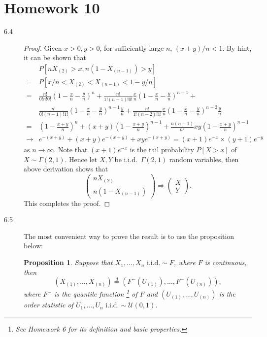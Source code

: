 \documentclass{article}
\theoremstyle{definition}
\theoremstyle{plain}
\newtheorem*{prop}{Proposition}
\theoremstyle{remark}
\begin{document}
\newpage

\section*{Homework 10}
\begin{description}
\item[6.4]
\begin{proof}
Given $x > 0, y > 0$, for sufficiently large $n$, $(x + y)/n < 1$. By hint, it can be shown that
\begin{align*}
& P[nX_{(2)} > x, n(1 - X_{(n - 1)}) > y] \\
= & P[x/n < X_{(2)} < X_{(n - 1)} < 1 - y/n] \\
= & \frac{n!}{0!n!0!}\left(1 - \frac{x}{n} - \frac{y}{n}\right)^{n} + \frac{n!}{1!(n - 1)!0!}\frac{x}{n}\left(1 - \frac{x}{n} - \frac{y}{n}\right)^{n - 1} + \\
& \frac{n!}{0!(n - 1)!1!}\left(1 - \frac{x}{n} - \frac{y}{n}\right)^{n - 1}\frac{y}{n} + \frac{n!}{1!(n - 2)!1!}\frac{x}{n}\left(1 - \frac{x}{n} - \frac{y}{n}\right)^{n - 2}\frac{y}{n} \\
= & \left(1 - \frac{x + y}{n}\right)^{n} + (x + y)\left(1 - \frac{x + y}{n}\right)^{n - 1} + \frac{n(n - 1)}{n^2}xy\left(1 - \frac{x + y}{n}\right)^{n - 1} \\
\to & e^{-(x + y)} + (x + y)e^{-(x + y)} + xye^{-(x + y)} = (x + 1)e^{-x} \times (y + 1)e^{-y}
\end{align*}
as $n \to \infty$. Note that $(x + 1)e^{-x}$ is the tail probability $P[X > x]$ of $X \sim \Gamma(2, 1)$. Hence let $X, Y$ be i.i.d.\  $\Gamma(2, 1)$ random variables, then above derivation shows that
\begin{equation*}
\begin{pmatrix}
nX_{(2)} \\
n(1 - X_{(n - 1)})
\end{pmatrix}
\Rightarrow 
\begin{pmatrix}
X \\
Y
\end{pmatrix}.
\end{equation*}
This completes the proof.
\end{proof}

\item[6.5]
The most convenient way to prove the result is to use the proposition below:
\begin{prop}
Suppose that
$X_1, \ldots, X_n \text{ i.i.d.} \sim F$, where $F$ is continuous, then
$$(X_{(1)}, \ldots, X_{(n)}) 
\overset{d} = (F^{-}(U_{(1)}), \ldots, F^{-}(U_{(n)})),$$
where $F^{-}$ is the quantile function \footnote{See Homework 6 for its
definition and basic properties.} of $F$ and $(U_{(1)}, \ldots, U_{(n)})$ is the
order statistic of $U_1, \ldots, U_n \text{ i.i.d.} \sim \mathcal{U}(0, 1)$. 
\end{prop}


\end{description}
\end{document}
